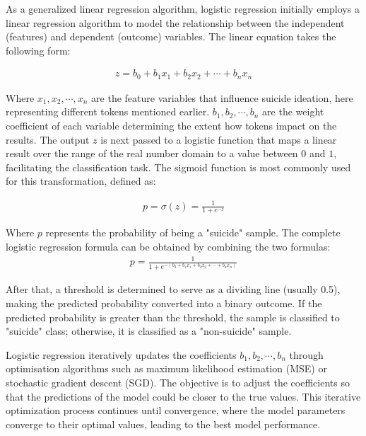 \documentclass[ %
                    author={Bocheng Wang},
                supervisor={Dr. Qiang Liu},
                    degree={MSc},
                     title={A Research on Identification of Suicide Ideation in Texts with Multiple Models},
                      type={},
                      year={2024}]{dissertation}
\begin{document}
As a generalized linear regression algorithm, logistic regression initially employs a linear regression algorithm to model the relationship between the independent (features) and dependent (outcome) variables. The linear equation takes the following form:

\begin{eqnarray}
      z=b_0+b_1x_1+b_2x_2+\cdots+b_nx_n
      \label{Linear Regression}
\end{eqnarray}

Where $x_1,x_2,\cdots,x_n$ are the feature variables that influence suicide ideation, here representing different tokens mentioned earlier. $b_1,b_2,\cdots,b_n$ are the weight coefficient of each variable determining the extent how tokens impact on the results. The output $z$ is next passed to a logistic function that maps a linear result over the range of the real number domain to a value between $0$ and $1$, facilitating the classification task. The sigmoid function is most commonly used for this transformation, defined as:

\begin{eqnarray}
      p=\sigma(z)=\frac{1}{1 + e^{-z}}
      \label{Sigmoid Function}
\end{eqnarray}

Where $p$ represents the probability of being a "suicide" sample. The complete logistic regression formula can be obtained by combining the two formulas:
\begin{eqnarray}
      p=\frac{1}{1 + e^{-(b_0+b_1x_1+b_2x_2+\cdots+b_nx_n)}}
      \label{Logistic Regression}
\end{eqnarray}

After that, a threshold is determined to serve as a dividing line (usually 0.5), making the predicted probability converted into a binary outcome. If the predicted probability is greater than the threshold, the sample is classified to "suicide" class; otherwise, it is classified as a "non-suicide" sample.

Logistic regression iteratively updates the coefficients $b_1,b_2,\cdots,b_n$ through optimisation algorithms such as maximum likelihood estimation (MSE) or stochastic gradient descent (SGD). The objective is to adjust the coefficients so that the predictions of the model could be closer to the true values. This iterative optimization process continues until convergence, where the model parameters converge to their optimal values, leading to the best model performance.
\end{document}
